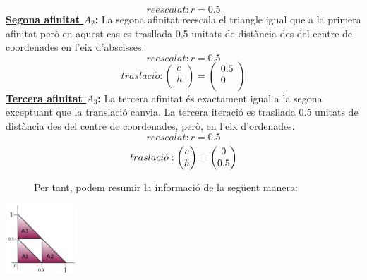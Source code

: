 \documentclass[12pt]{report}
\begin{document}
$$reescalat: r=0.5$$
\textbf{\underline{Segona afinitat $A_2$}:} 
\newline
La segona afinitat reescala el triangle igual que a la primera afinitat però en aquest cas es trasllada 0,5 unitats de distància des del centre de coordenades en l'eix d'abscisses.
$$reescalat: r=0.5$$
$$traslaci\acute{o}:
\begin{pmatrix}
e\\
h\\
\end{pmatrix} 
=
\begin{pmatrix}
0.5\\
0\\
\end{pmatrix} $$
\textbf{\underline{Tercera afinitat $A_3$}:} 
\newline
La tercera afinitat és exactament igual a la segona exceptuant que la translació canvia. La tercera iteració es trasllada 0.5 unitats de distància des del centre de coordenades, però, en l'eix d'ordenades.
$$reescalat: r=0.5$$
$$traslaci\Acute{o}:
\begin{pmatrix}
e\\
h\\
\end{pmatrix} 
=
\begin{pmatrix}
0\\
0.5\\
\end{pmatrix} $$
\newline
\newline
\newline
\newline
\newline
\newline
\newline
\newline
\newline
\hspace{-3em}\begin{figure}
 Per tant, podem resumir la informació de la següent manera:
\end{figure}

\hspace{-8cm}   \includegraphics [width=0.2\textwidth] {A1A2A3.jpg}
\end{document}
